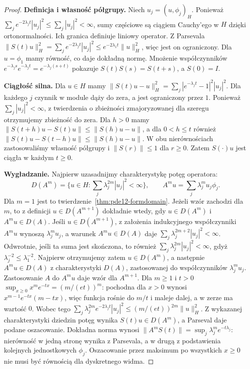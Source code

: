 \begin{proof}
\textbf{Definicja i własność półgrupy.}
Niech $u_j=(u,\phi_j)_H$. Ponieważ
$\sum_j e^{-2\lambda_jt}|u_j|^2\le\sum_j|u_j|^2<\infty$,
sumy częściowe są ciągiem Cauchy'ego w $H$ dzięki
ortonormalności. Ich granica definiuje liniowy operator.
Z Parsevala
$\|S(t)u\|_H^2=\sum_je^{-2\lambda_jt}|u_j|^2
\le e^{-2\lambda_1t}\|u\|_H^2$, więc jest on ograniczony. Dla $u=\phi_1$ mamy
równość, co daje dokładną normę. Mnożenie współczynników
$e^{-\lambda_js}e^{-\lambda_jt}=e^{-\lambda_j(s+t)}$
pokazuje $S(t)S(s)=S(t+s)$, a $S(0)=I$.

\textbf{Ciągłość silna.} Dla $u\in H$ mamy
$\|S(t)u-u\|_H^2=\sum_j|e^{-\lambda_jt}-1|^2|u_j|^2$.
Dla każdego $j$ czynnik w module dąży do zera,
a jest ograniczony przez $1$. Ponieważ
$\sum_j|u_j|^2<\infty$, z twierdzenia o zbieżności
zmajoryzowanej dla szeregu otrzymujemy zbieżność do zera.
Dla $h>0$ mamy
$\|S(t+h)u-S(t)u\|\le\|S(h)u-u\|$,
a dla $0<h\le t$ również
$\|S(t)u-S(t-h)u\|\le\|S(h)u-u\|$.
W obu nierównościach zastosowaliśmy własność półgrupy
i $\|S(r)\|\le1$ dla $r\ge0$. Zatem $S(\cdot)u$
jest ciągła w każdym $t\ge0$.

\textbf{Wygładzanie.} Najpierw uzasadnijmy charakterystykę
potęg operatora:
\[
 D(A^m)=\{u\in H:\sum_j\lambda_j^{2m}|u_j|^2<\infty\},
 \qquad A^mu=\sum_j\lambda_j^m u_j\phi_j .
\]
Dla $m=1$ jest to twierdzenie~\ref{thm:pde12-formdomain}.
Jeżeli wzór zachodzi dla $m$, to z definicji
$u\in D(A^{m+1})$ dokładnie wtedy, gdy $u\in D(A^m)$
i $A^mu\in D(A)$. Jeśli $u\in D(A^{m+1})$, z założenia indukcyjnego
współczynniki $A^mu$ wynoszą $\lambda_j^mu_j$,
a warunek $A^mu\in D(A)$ daje
$\sum_j\lambda_j^{2m+2}|u_j|^2<\infty$.
Odwrotnie, jeśli ta suma jest skończona, to również
$\sum_j\lambda_j^{2m}|u_j|^2<\infty$, gdyż
$\lambda_j^{-2}\le\lambda_1^{-2}$. Najpierw otrzymujemy
zatem $u\in D(A^m)$, a następnie $A^mu\in D(A)$
z charakterystyki $D(A)$, zastosowanej do współczynników
$\lambda_j^mu_j$. Zastosowanie $A$ do $A^mu$
daje wzór dla $A^{m+1}$.
Dla $m\ge1$ i $t>0$
$\sup_{x\ge0}x^me^{-tx}=(m/(et))^m$:
pochodna dla $x>0$ wynosi
$x^{m-1}e^{-tx}(m-tx)$, więc funkcja rośnie do $m/t$
i maleje dalej, a w zerze ma wartość $0$.
Wobec tego
$\sum_j\lambda_j^{2m}e^{-2\lambda_jt}|u_j|^2
\le(m/(et))^{2m}\|u\|_H^2$.
Z wykazanej charakterystyki dziedzin potęg wynika
$S(t)u\in D(A^m)$, a Parseval daje podane oszacowanie.
Dokładna norma wynosi
$\|A^mS(t)\|=\sup_j\lambda_j^me^{-t\lambda_j}$:
nierówność w jedną stronę wynika z Parsevala, a w drugą
z podstawienia kolejnych jednostkowych $\phi_j$.
Oszacowanie przez maksimum po wszystkich $x\ge0$
nie musi być równością dla dyskretnego widma.


\end{proof}
